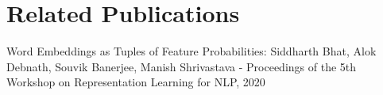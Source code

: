 \documentclass[11pt]{book}
\begin{document}
\chapter*{Related Publications}
\label{ch:relatedPubs}
% 


Word Embeddings as Tuples of Feature Probabilities: Siddharth Bhat, Alok Debnath, Souvik Banerjee, Manish Shrivastava - Proceedings of the 5th Workshop on Representation Learning for NLP, 2020




 
\end{document}

